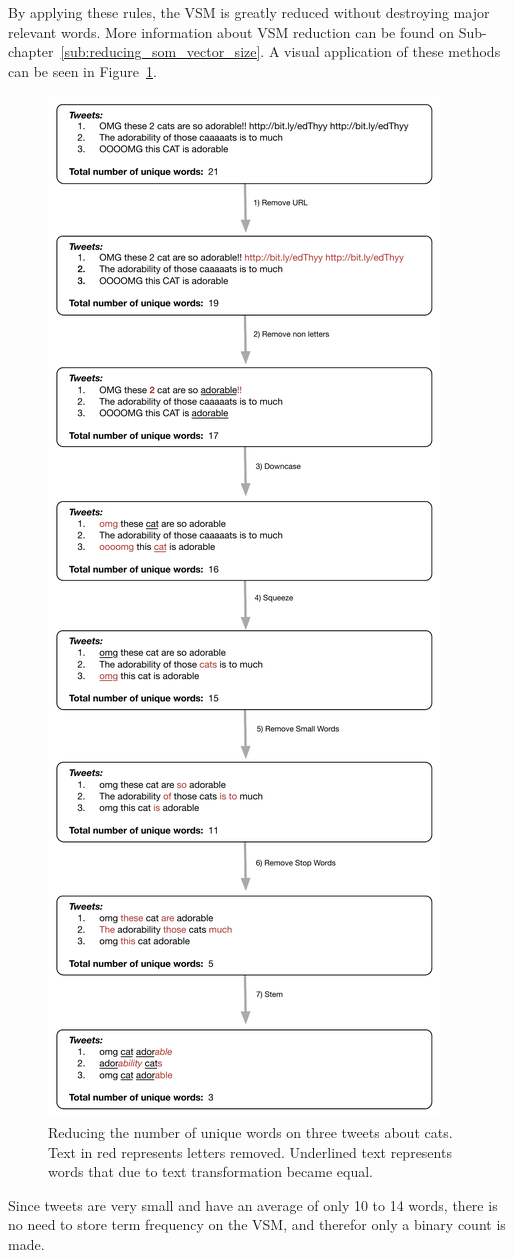 By applying these rules, the \ac{VSM} is greatly reduced without destroying major relevant words. More information about \ac{VSM} reduction can be found on Sub-chapter~\ref{sub:reducing_som_vector_size}. A visual application of these methods can be seen in Figure~\ref{fig:string_reduction}.
\begin{figure}[htpb]
  \centering
  \includegraphics[width=0.5\linewidth]{./images/string_reduction.pdf}
  \caption{Reducing the number of unique words on three tweets about cats. Text in red represents letters removed. Underlined text represents words that due to text transformation became equal.}
  \label{fig:string_reduction}
\end{figure}

Since tweets are very small and have an average of only 10 to 14 words, there is no need to store term frequency on the \ac{VSM}, and therefor only a binary count is made.

